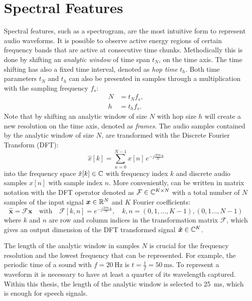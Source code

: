 
\section{Spectral Features}\label{sec:signal_spec}
\thesisStateRevised
Spectral features, such as a spectrogram, are the most intuitive form to represent audio waveforms. 
It is possible to observe active energy regions of certain frequency bands that are active at consecutive time chunks.
Methodically this is done by shifting an \emph{analytic window} of time span $t_N$, on the time axis.
The time shifting has also a fixed time interval, denoted as \emph{hop time} $t_{h}$.
Both time parameters $t_N$ and $t_h$ can also be presented in samples through a multiplication with the sampling frequency $f_s$:
\begin{equation}
  \begin{split}
    N &= t_N f_s, \\
    h &= t_h f_s.
  \end{split}
\end{equation}
Note that by shifting an analytic window of size $N$ with hop size $h$ will create a new resolution on the time axis, denoted as \emph{frames}.
The audio samples contained by the analytic window of size $N$, are transformed with the Discrete Fourier Transform (DFT):
\begin{equation}\label{eq:signal_spec_dtft}
  \hat{x}[k] = \sum_{n=0}^{N-1} x[n] \, e^{-j\frac{2 \pi n}{N}k}
\end{equation}
into the frequency space $\hat{x}[k] \in \mathbb{C}$ with frequency index $k$ and discrete audio samples $x[n]$ with sample index $n$.
More conveniently,  can be written in matrix notation with the DFT operator denoted as $\mathcal{F} \in \mathbb{C}^{K \times N}$ with a total number of $N$ samples of the input signal $\bm{x} \in \mathbb{R}^N$ and $K$ Fourier coefficients:
\begin{equation}\label{eq:signal_spec_dtft_matrix}
  \hat{\bm{x}} = \mathcal{F} \bm{x} \quad \mathrm{with} 
  \quad \mathcal{F}[k, n] = e^{-j\frac{2 \pi n}{N} k},
  \quad k, n = (0, 1, \dots, K-1), (0, 1 \dots, N-1)
\end{equation}
where $k$ and $n$ are row and column indices in the transformation matrix $\mathcal{F}$, which gives an output dimension of the DFT transformed signal $\hat{\bm{x}} \in \mathbb{C}^K$.

The length of the analytic window in samples $N$ is crucial for the frequency resolution and the lowest frequency that can be represented.
For example, the periodic time of a sound with $f=\SI{20}{\hertz}$ is $t=\frac{1}{f} = \SI{50}{\milli\second}$.
To represent a waveform it is necessary to have at least a quarter of its wavelength captured.
Within this thesis, the length of the analytic window is selected to \SI{25}{\milli\second}, which is enough for speech signals.

